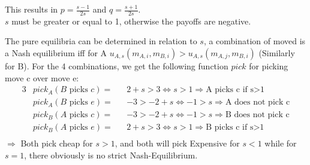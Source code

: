         This results in $p=\frac{s-1}{2s}$ and $q=\frac{s+1}{2s}$. \\
        $s$ must be greater or equal to 1, otherwise the payoffs are negative. \\
        \par
        The pure equilibria can be determined in relation to $s$, a combination of moved is a Nash equilibrium iff for A $u_{A,s}(m_{A,i}, m_{B,i})>u_{A,s}(m_{A,j}, m_{B,i})$ (Similarly for B).
        For the 4 combinations, we get the following function $pick$ for picking move c over move e:
        \begin{alignat*}{3}
            &pick_A(B \text{ picks } c)=&& 2+s>3 \Leftrightarrow s>1 \Rightarrow \text{A picks c if s>1}\\
            &pick_A(B \text{ picks } e)=&& -3>-2+s \Leftrightarrow -1>s \Rightarrow \text{A does not pick c}\\
            &pick_B(A \text{ picks } c)=&& -3>-2+s \Leftrightarrow -1>s \Rightarrow \text{B does not pick c}\\
            &pick_B(A \text{ picks } e)=&& 2+s>3 \Leftrightarrow s>1 \Rightarrow \text{B picks c if s>1}\\
        \end{alignat*}
        $\Rightarrow$ Both pick cheap for $s>1$, and both will pick Expensive for $s<1$ while for $s=1$, there obviously is no strict Nash-Equilibrium.


   
